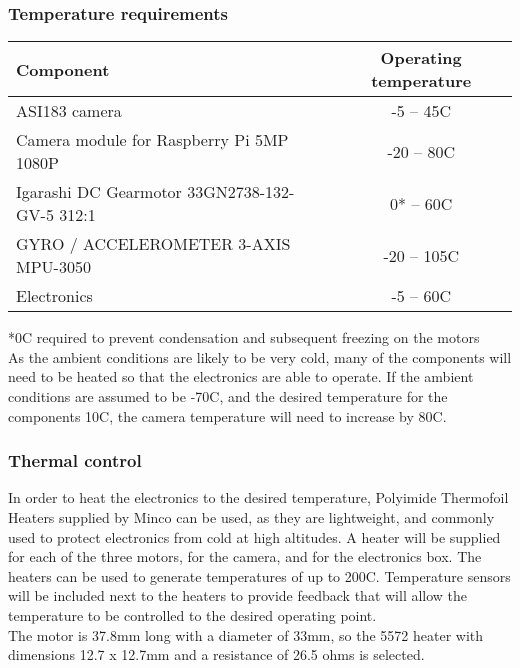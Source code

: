 \subsubsection{Temperature requirements}

\begin{center}
  \begin{tabular}{ | l | c | }
    \hline
    \textbf{Component} & \textbf{Operating temperature} \\ \hline
    ASI183 camera  & -5 – 45C \\ \hline
    Camera module for Raspberry Pi 5MP 1080P & -20 – 80C \\ \hline
    Igarashi DC Gearmotor 33GN2738-132-GV-5 312:1  & 0* – 60C \\ \hline
    GYRO / ACCELEROMETER 3-AXIS  MPU-3050 & -20 – 105C \\ \hline 
    Electronics  & -5 – 60C \\ \hline
  \end{tabular}
\end{center}

*0C required to prevent condensation and subsequent freezing on the motors\\

As the ambient conditions are likely to be very cold, many of the components will need to be heated so that the electronics are able to operate. If the ambient conditions are assumed to be -70C, and the desired temperature for the components 10C, the camera temperature will need to increase by 80C.\

\subsubsection{Thermal control}
In order to heat the electronics to the desired temperature, Polyimide Thermofoil Heaters supplied by Minco can be used, as they are lightweight, and commonly used to protect electronics from cold at high altitudes. A heater will be supplied for each of the three motors, for the camera, and for the electronics box. The heaters can be used to generate temperatures of up to 200C. Temperature sensors will be included next to the heaters to provide feedback that will allow the temperature to be controlled to the desired operating point. \\

The motor is 37.8mm long with a diameter of 33mm, so the 5572 heater with dimensions 12.7 x 12.7mm and a resistance of 26.5 ohms is selected.\\

